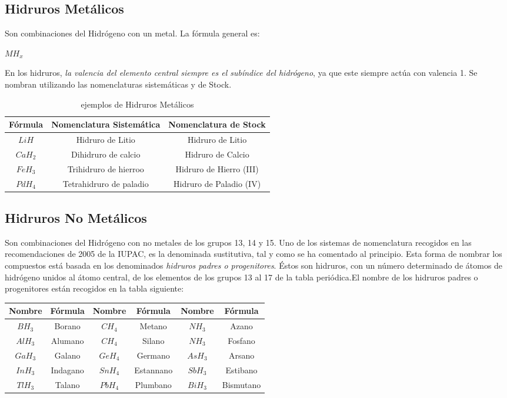 \subsection{Hidruros Metálicos}
Son combinaciones del Hidrógeno con un metal. La fórmula general es:\\
\begin{center}
	$MH_x$
\end{center}
En los hidruros, \emph{la valencia del elemento central siempre es el subíndice del hidrógeno}, ya que este siempre actúa con valencia 1. Se nombran utilizando las nomenclaturas sistemáticas y de Stock.

\begin{table}[h!]
	\centering
	\begin{tabular}{c|cc}
	Fórmula&Nomenclatura Sistemática&Nomenclatura de Stock\\ \hline
	$LiH$&Hidruro de Litio&Hidruro de Litio\\ 
	$CaH_2$&Dihidruro de calcio&Hidruro de Calcio\\
	$FeH_3$&Trihidruro de hierroo&Hidruro de Hierro (III)\\
	$PdH_4$&Tetrahidruro de paladio&Hidruro de Paladio (IV)\\ \hline
	\end{tabular}
	\caption{ejemplos de Hidruros Metálicos}
\end{table}
\subsection{Hidruros No Metálicos}
Son combinaciones del Hidrógeno con no metales de los grupos 13, 14 y 15. Uno de los sistemas de nomenclatura recogidos en las recomendaciones de 2005 de la IUPAC, es la denominada sustitutiva, tal y como se ha comentado al principio. Esta forma de nombrar los compuestos está basada en los denominados \emph{hidruros padres o progenitores}. Éstos son hidruros, con un número determinado de átomos de hidrógeno unidos al átomo central, de los elementos de los grupos 13 al 17 de la tabla periódica.El nombre de los hidruros padres o progenitores están recogidos en la tabla siguiente:
\begin{table}[h!]
	\centering
	\begin{tabular}{|c|c||c|c||c|c|}\hline
		Nombre&Fórmula&Nombre&Fórmula&Nombre&Fórmula\\ \hline
		$BH_3$&Borano&$CH_4$&Metano&$NH_3$&Azano\\
		$AlH_3$&Alumano&$CH_4$&Silano&$NH_3$&Fosfano\\
		$GaH_3$&Galano&$GeH_4$&Germano&$AsH_3$&Arsano\\
		$InH_3$&Indagano&$SnH_4$&Estannano&$SbH_3$&Estibano\\
		$TlH_3$&Talano&$PbH_4$&Plumbano&$BiH_3$&Bismutano\\ \hline
		
	\end{tabular}
\end{table}

